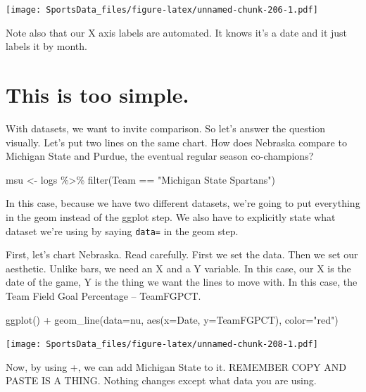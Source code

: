 \documentclass[
]{book}
\newenvironment{Shaded}{\begin{snugshade}}{\end{snugshade}}
\newcommand{\AttributeTok}[1]{\textcolor[rgb]{0.77,0.63,0.00}{#1}}
\newcommand{\FunctionTok}[1]{\textcolor[rgb]{0.00,0.00,0.00}{#1}}
\newcommand{\NormalTok}[1]{#1}
\newcommand{\OtherTok}[1]{\textcolor[rgb]{0.56,0.35,0.01}{#1}}
\newcommand{\SpecialCharTok}[1]{\textcolor[rgb]{0.00,0.00,0.00}{#1}}
\newcommand{\StringTok}[1]{\textcolor[rgb]{0.31,0.60,0.02}{#1}}
\begin{document}
\texttt{[image: SportsData\_files/figure-latex/unnamed-chunk-206-1.pdf]}

Note also that our X axis labels are automated. It knows it's a date and it just labels it by month.

\hypertarget{this-is-too-simple.}{%
\section{This is too simple.}\label{this-is-too-simple.}}

With datasets, we want to invite comparison. So let's answer the question visually. Let's put two lines on the same chart. How does Nebraska compare to Michigan State and Purdue, the eventual regular season co-champions?

\begin{Shaded}
\begin{Highlighting}[]
\NormalTok{msu }\OtherTok{\textless{}{-}}\NormalTok{ logs }\SpecialCharTok{\%\textgreater{}\%} \FunctionTok{filter}\NormalTok{(Team }\SpecialCharTok{==} \StringTok{"Michigan State Spartans"}\NormalTok{)}
\end{Highlighting}
\end{Shaded}

In this case, because we have two different datasets, we're going to put everything in the geom instead of the ggplot step. We also have to explicitly state what dataset we're using by saying \texttt{data=} in the geom step.

First, let's chart Nebraska. Read carefully. First we set the data. Then we set our aesthetic. Unlike bars, we need an X and a Y variable. In this case, our X is the date of the game, Y is the thing we want the lines to move with. In this case, the Team Field Goal Percentage -- TeamFGPCT.

\begin{Shaded}
\begin{Highlighting}[]
\FunctionTok{ggplot}\NormalTok{() }\SpecialCharTok{+} \FunctionTok{geom\_line}\NormalTok{(}\AttributeTok{data=}\NormalTok{nu, }\FunctionTok{aes}\NormalTok{(}\AttributeTok{x=}\NormalTok{Date, }\AttributeTok{y=}\NormalTok{TeamFGPCT), }\AttributeTok{color=}\StringTok{"red"}\NormalTok{)}
\end{Highlighting}
\end{Shaded}

\texttt{[image: SportsData\_files/figure-latex/unnamed-chunk-208-1.pdf]}

Now, by using +, we can add Michigan State to it. REMEMBER COPY AND PASTE IS A THING. Nothing changes except what data you are using.
\end{document}
